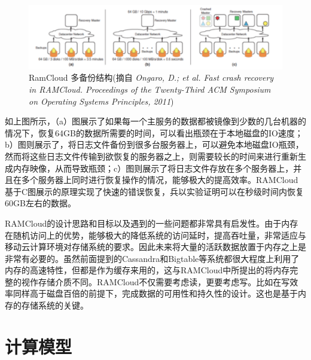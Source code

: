 \begin{figure}[]
\centering
\includegraphics[width=4.5in]{../figures/ramdist.pdf}
\caption{RamCloud 多备份结构(摘自\textit{
Ongaro, D.; et al. Fast crash recovery in RAMCloud. Proceedings of the Twenty-Third ACM Symposium on Operating Systems Principles, 2011})}
\label{fig:ramdist}
\end{figure}

如上图所示，（a）图展示了如果每一个主服务的数据都被镜像到少数的几台机器的情况下，恢复64GB的数据所需要的时间，可以看出瓶颈在于本地磁盘的IO速度；b）图则展示了，将日志文件备份到很多台服务器上，可以避免本地磁盘IO瓶颈，然而将这些日志文件传输到欲恢复的服务器之上，则需要较长的时间来进行重新生成内存映像，从而导致瓶颈；c）图则展示了将日志文件存放在多个服务器上，并且在多个服务器上同时进行恢复操作的情况，能够极大的提高效率。RAMCloud基于C图展示的原理实现了快速的错误恢复，兵以实验证明可以在秒级时间内恢复60GB左右的数据。

  RAMCloud的设计思路和目标以及遇到的一些问题都非常具有启发性。由于内存在随机访问上的优势，能够极大的降低系统的访问延时，提高吞吐量，非常适应与移动云计算环境对存储系统的要求。因此未来将大量的活跃数据放置于内存之上是非常有必要的。虽然前面提到的Cassandra和Bigtable等系统都很大程度上利用了内存的高速特性，但都是作为缓存来用的，这与RAMCloud中所提出的将内存完整的视作存储介质不同。RAMCloud不仅需要考虑读，更要考虑写。比如在写效率同样高于磁盘百倍的前提下，完成数据的可用性和持久性的设计。这也是基于内存的存储系统的关键。


\section{计算模型}
